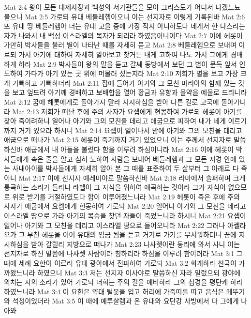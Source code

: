Mat 2:4  왕이 모든 대제사장과 백성의 서기관들을 모아 그리스도가 어디서 나겠느뇨 물으니
Mat 2:5  가로되 유대 베들레헴이오니 이는 선지자로 이렇게 기록된바
Mat 2:6  또 유대 땅 베들레헴아 너는 유대 고을 중에 가장 작지 아니하도다 네게서 한 다스리는 자가 나와서 내 백성 이스라엘의 목자가 되리라 하였음이니이다
Mat 2:7  이에 헤롯이 가만히 박사들을 불러 별이 나타난 때를 자세히 묻고
Mat 2:8  베들레헴으로 보내며 이르되 가서 아기에 대하여 자세히 알아보고 찾거든 내게 고하여 나도 가서 그에게 경배하게 하라
Mat 2:9  박사들이 왕의 말을 듣고 갈쌔 동방에서 보던 그 별이 문득 앞서 인도하여 가다가 아기 있는 곳 위에 머물러 섰는지라
Mat 2:10  저희가 별을 보고 가장 크게 기뻐하고 기뻐하더라
Mat 2:11  집에 들어가 아기와 그 모친 마리아의 함께 있는 것을 보고 엎드려 아기께 경배하고 보배합을 열어 황금과 유향과 몰약을 예물로 드리니라
Mat 2:12  꿈에 헤롯에게로 돌아가지 말라 지시하심을 받아 다른 길로 고국에 돌아가니라
Mat 2:13  저희가 떠난 후에 주의 사자가 요셉에게 현몽하여 가로되 헤롯이 아기를 찾아 죽이려하니 일어나 아기와 그의 모친을 데리고 애굽으로 피하여 내가 네게 이르기까지 거기 있으라 하시니
Mat 2:14  요셉이 일어나서 밤에 아기와 그의 모친을 데리고 애굽으로 떠나가
Mat 2:15  헤롯이 죽기까지 거기 있었으니 이는 주께서 선지자로 말씀하신바 애굽에서 내 아들을 불렀다 함을 이루려 하심이니라
Mat 2:16  이에 헤롯이 박사들에게 속은 줄을 알고 심히 노하여 사람을 보내어 베들레헴과 그 모든 지경 안에 있는 사내아이를 박사들에게 자세히 알아 본 그 때를 표준하여 두 살부터 그 아래로 다 죽이니
Mat 2:17  이에 선지자 예레미야로 말씀하신바
Mat 2:18  라마에서 슬퍼하며 크게 통곡하는 소리가 들리니 라헬이 그 자식을 위하여 애곡하는 것이라 그가 자식이 없으므로 위로 받기를 거절하였도다 함이 이루어졌느니라
Mat 2:19  헤롯이 죽은 후에 주의 사자가 애굽에서 요셉에게 현몽하여 가로되
Mat 2:20  일어나 아기와 그 모친을 데리고 이스라엘 땅으로 가라 아기의 목숨을 찾던 자들이 죽었느니라 하시니
Mat 2:21  요셉이 일어나 아기와 그 모친을 데리고 이스라엘 땅으로 들어오니라
Mat 2:22  그러나 아켈라오가 그 부친 헤롯을 이어 유대의 임금 됨을 듣고 거기로 가기를 무서워하더니 꿈에 지시하심을 받아 갈릴리 지방으로 떠나가
Mat 2:23  나사렛이란 동리에 와서 사니 이는 선지자로 하신 말씀에 나사렛 사람이라 칭하리라 하심을 이루려 함이러라
Mat 3:1  그 때에 세례 요한이 이르러 유대 광야에서 전파하여 가로되
Mat 3:2  회개하라 천국이 가까왔느니라 하였으니
Mat 3:3  저는 선지자 이사야로 말씀하신 자라 일렀으되 광야에 외치는 자의 소리가 있어 가로되 너희는 주의 길을 예비하라 그의 첩경을 평탄케 하라 하였느니라
Mat 3:4  이 요한은 약대 털옷을 입고 허리에 가죽띠를 띠고 음식은 메뚜기와 석청이었더라
Mat 3:5  이 때에 예루살렘과 온 유대와 요단강 사방에서 다 그에게 나아와
